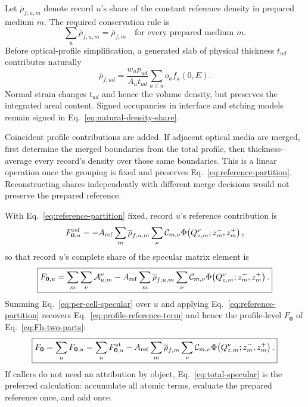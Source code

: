 Let $\overline\rho_{f,u,m}$ denote record $u$'s share of the constant reference
density in prepared medium $m$.  The required conservation rule is
\begin{equation}
  \boxed{
  \sum_u\overline\rho_{f,u,m}=\overline\rho_{f,m}
  \quad\text{for every prepared medium }m.
  }
  \label{eq:reference-partition}
\end{equation}
Before optical-profile simplification, a generated slab of physical thickness
$t_{ud}$ contributes naturally
\begin{equation}
  \overline\rho_{f,ud}
  =\frac{w_u p_{ud}}{A_u t_{ud}}
   \sum_{a\in u}o_a f_a(0,E).
  \label{eq:natural-density-share}
\end{equation}
Normal strain changes $t_{ud}$ and hence the volume density, but preserves the
integrated areal content.  Signed occupancies in interface and etching models
remain signed in Eq.~\eqref{eq:natural-density-share}.

Coincident profile contributions are added.  If adjacent optical media are
merged, first determine the merged boundaries from the total profile, then
thickness-average every record's density over those same boundaries.  This is
a linear operation once the grouping is fixed and preserves
Eq.~\eqref{eq:reference-partition}.  Reconstructing shares independently with
different merge decisions would not preserve the prepared reference.

With Eq.~\eqref{eq:reference-partition} fixed, record $u$'s reference
contribution is
\begin{equation}
  F_{\bm 0,u}^{\rm ref}
  =-A_{\rm ref}
   \sum_m\overline\rho_{f,u,m}
   \sum_\nu\mathcal C_{m,\nu}
   \Phi\!\left(Q_{z,m}^{\nu};z_m^-,z_m^+\right),
  \label{eq:per-cell-reference}
\end{equation}
so that record $u$'s complete share of the specular matrix element is
\begin{equation}
  \boxed{
  F_{\bm 0,u}
  =\sum_m\sum_\nu\mathcal A_{u,m}^{\nu}
   -A_{\rm ref}
    \sum_m\overline\rho_{f,u,m}
    \sum_\nu\mathcal C_{m,\nu}
    \Phi\!\left(Q_{z,m}^{\nu};z_m^-,z_m^+\right).
  }
  \label{eq:per-cell-specular}
\end{equation}
Summing Eq.~\eqref{eq:per-cell-specular} over $u$ and applying
Eq.~\eqref{eq:reference-partition} recovers
Eq.~\eqref{eq:profile-reference-term} and hence the profile-level
$F_{\bm 0}$ of Eq.~\eqref{eq:Fh-two-parts}:
\begin{equation}
  \boxed{
  F_{\bm 0}
  =\sum_uF_{\bm 0,u}
  =\sum_uF_{\bm 0,u}^{\rm at}
   -A_{\rm ref}
    \sum_m\overline\rho_{f,m}
    \sum_\nu\mathcal C_{m,\nu}
    \Phi\!\left(Q_{z,m}^{\nu};z_m^-,z_m^+\right).
  }
  \label{eq:total-specular}
\end{equation}
If callers do not need an attribution by object,
Eq.~\eqref{eq:total-specular} is the preferred calculation: accumulate all
atomic terms, evaluate the prepared reference once, and add once.

